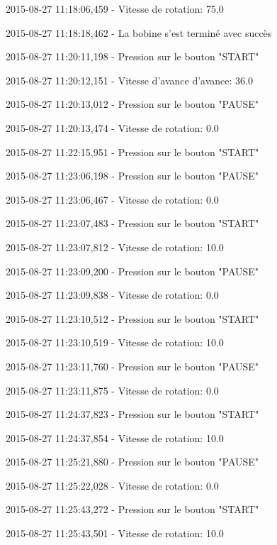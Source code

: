 \documentclass[a4paper, 11pt]{article}
\begin{document}
2015-08-27 11\string:18\string:06,459 - Vitesse de rotation\string: 75.0

2015-08-27 11\string:18\string:18,462 - La bobine s'est terminé avec succès

2015-08-27 11\string:20\string:11,198 - Pression sur le bouton "START"

2015-08-27 11\string:20\string:12,151 - Vitesse d'avance d'avance\string: 36.0

2015-08-27 11\string:20\string:13,012 - Pression sur le bouton "PAUSE"

2015-08-27 11\string:20\string:13,474 - Vitesse de rotation\string: 0.0

2015-08-27 11\string:22\string:15,951 - Pression sur le bouton "START"

2015-08-27 11\string:23\string:06,198 - Pression sur le bouton "PAUSE"

2015-08-27 11\string:23\string:06,467 - Vitesse de rotation\string: 0.0

2015-08-27 11\string:23\string:07,483 - Pression sur le bouton "START"

2015-08-27 11\string:23\string:07,812 - Vitesse de rotation\string: 10.0

2015-08-27 11\string:23\string:09,200 - Pression sur le bouton "PAUSE"

2015-08-27 11\string:23\string:09,838 - Vitesse de rotation\string: 0.0

2015-08-27 11\string:23\string:10,512 - Pression sur le bouton "START"

2015-08-27 11\string:23\string:10,519 - Vitesse de rotation\string: 10.0

2015-08-27 11\string:23\string:11,760 - Pression sur le bouton "PAUSE"

2015-08-27 11\string:23\string:11,875 - Vitesse de rotation\string: 0.0

2015-08-27 11\string:24\string:37,823 - Pression sur le bouton "START"

2015-08-27 11\string:24\string:37,854 - Vitesse de rotation\string: 10.0

2015-08-27 11\string:25\string:21,880 - Pression sur le bouton "PAUSE"

2015-08-27 11\string:25\string:22,028 - Vitesse de rotation\string: 0.0

2015-08-27 11\string:25\string:43,272 - Pression sur le bouton "START"

2015-08-27 11\string:25\string:43,501 - Vitesse de rotation\string: 10.0
\end{document}
